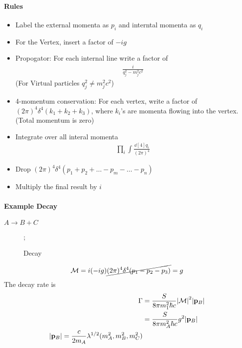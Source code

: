 \documentclass[../main.tex]{subfiles}
\begin{document}
\paragraph*{Rules}
\begin{itemize}
    \item Label the external momenta as $p_i$ and interntal momenta as $q_i$
    \item For the Vertex, insert a factor of $-ig$
    \item Propogator: For each internal line write a factor of 
    \begin{align*}
        \frac{i}{q_j^2 - m_j^2c^2}
    \end{align*}
    (For Virtual particles $q_j^2 \neq m_j^2 c^2$)
    \item 4-momentum conservation: For each vertex, write a factor of \((2\pi)^4 \delta^4(k_1 + k_2 + k_3)\),
    where $k_i$'s are momenta flowing into the vertex. (Total momentum is zero)
    \item Integrate over all interal momenta
    \begin{align*}
        \prod_i \int \frac{\dd[4]{q_i}}{(2\pi)^4}
    \end{align*}
    \item Drop \((2\pi)^4 \delta^4(p_1 + p_2 + \dots - p_m - \dots - p_n)\)
    \item Multiply the final result by $i$
\end{itemize}
\paragraph*{Example Decay} $A \to B + C$
\begin{figure}[ht]
    \centering
    ;
    \caption{Decay}
\end{figure}
\begin{align*}
    \mathcal{M} = i (-ig) \cancel{(2\pi)^4 \delta^4(p_1 - p_2 - p_3)} = g
\end{align*}
The decay rate is
\begin{align*}
    \Gamma &= \frac{S}{8\pi m_1^2 \hbar c} \abs{\mathcal{M}}^2 \abs{\vb p_B} \\
    &= \frac{S}{8\pi m_A^2 \hbar c} g^2 \abs{\vb p_B} \\
    \abs{\vb p_B} = \frac{c}{2m_A} \lambda^{1/2}(m_A^2, m_B^2, m_C^2)
\end{align*}
\end{document}
